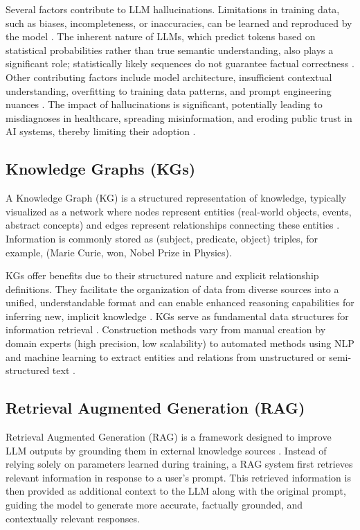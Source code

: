 \documentclass{article}
\begin{document}
Several factors contribute to LLM hallucinations. Limitations in training data, such as biases, incompleteness, or inaccuracies, can be learned and reproduced by the model \citep{weidinger2021ethical}. The inherent nature of LLMs, which predict tokens based on statistical probabilities rather than true semantic understanding, also plays a significant role; statistically likely sequences do not guarantee factual correctness \citep{bang2023multitask}. Other contributing factors include model architecture, insufficient contextual understanding, overfitting to training data patterns, and prompt engineering nuances \citep{zhang2023siren}. The impact of hallucinations is significant, potentially leading to misdiagnoses in healthcare, spreading misinformation, and eroding public trust in AI systems, thereby limiting their adoption \citep{huang2023survey}.

\subsection{Knowledge Graphs (KGs)}
A Knowledge Graph (KG) is a structured representation of knowledge, typically visualized as a network where nodes represent entities (real-world objects, events, abstract concepts) and edges represent relationships connecting these entities \citep{hogan2021knowledge}. Information is commonly stored as (subject, predicate, object) triples, for example, (Marie Curie, won, Nobel Prize in Physics).

KGs offer benefits due to their structured nature and explicit relationship definitions. They facilitate the organization of data from diverse sources into a unified, understandable format and can enable enhanced reasoning capabilities for inferring new, implicit knowledge \citep{paulheim2017knowledge}. KGs serve as fundamental data structures for information retrieval \citep{KGGen_Arxiv_2025}. Construction methods vary from manual creation by domain experts (high precision, low scalability) to automated methods using NLP and machine learning to extract entities and relations from unstructured or semi-structured text \citep{dong2014knowledge}.

\subsection{Retrieval Augmented Generation (RAG)}
Retrieval Augmented Generation (RAG) is a framework designed to improve LLM outputs by grounding them in external knowledge sources \citep{lewis2020retrieval}. Instead of relying solely on parameters learned during training, a RAG system first retrieves relevant information in response to a user's prompt. This retrieved information is then provided as additional context to the LLM along with the original prompt, guiding the model to generate more accurate, factually grounded, and contextually relevant responses.
\end{document}
